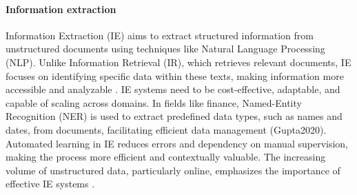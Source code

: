 \paragraph{Information extraction}
Information Extraction (IE) aims to extract structured information from unstructured documents using techniques like Natural Language Processing (NLP). Unlike Information Retrieval (IR), which retrieves relevant documents, IE focuses on identifying specific data within these texts, making information more accessible and analyzable \autocite{Javija2024}. IE systems need to be cost-effective, adaptable, and capable of scaling across domains. In fields like finance, Named-Entity Recognition (NER) is used to extract predefined data types, such as names and dates, from documents, facilitating efficient data management (Gupta2020). Automated learning in IE reduces errors and dependency on manual supervision, making the process more efficient and contextually valuable. The increasing volume of unstructured data, particularly online, emphasizes the importance of effective IE systems \autocite{Javija2024}.

